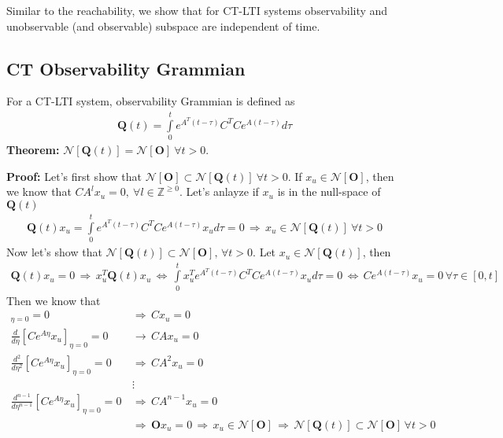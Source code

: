 \documentclass[twoside]{article}
\begin{document}
%
Similar to the reachability, we show that for CT-LTI systems
observability and unobservable (and observable) subspace
are independent of time. 

\subsection{CT Observability Grammian}

For a CT-LTI system, observability Grammian is defined as
%
\begin{align*}
    \textbf{Q}(t) = \int\limits_{0}^{t} e^{A^T (t - \tau)} C^T C e^{A (t - \tau)}  d \tau 
\end{align*}
%
\textbf{Theorem:} $\mathcal{N}[ \textbf{Q}(t) ] = \mathcal{N}[ \mathbf{O} ] \ \forall t > 0$. 

\textbf{Proof:} Let's first show that $\mathcal{N}[ \mathbf{O} ] \subset \mathcal{N}[ \textbf{Q}(t) ] \ \forall t > 0$. 
If $x_u \in \mathcal{N}[ \mathbf{O} ]$, then we know that $C A^{l} x_u = 0, \ \forall l \in \mathbb{Z}^{\geq 0}$. Let's anlayze 
if $x_u$ is in the null-space of $\textbf{Q}(t)$
%
\begin{align*}
    \textbf{Q}(t) x_u = \int\limits_{0}^{t} e^{A^T (t - \tau)} C^T C e^{A (t - \tau)} x_u d \tau
    = 0 \, \Rightarrow \, x_u \in \mathcal{N}[ \textbf{Q}(t) ] \ \forall t > 0
\end{align*}
%
Now let's show that $\mathcal{N}[ \textbf{Q}(t) ] \subset \mathcal{N}[ \mathbf{O} ], \, \forall t > 0$.
Let $x_u \in \mathcal{N}[ \textbf{Q}(t) ]$, then
\begin{align*}
    \textbf{Q}(t) x_u = 0 \, \Rightarrow \, x_u^T \textbf{Q}(t) x_u \, \iff \, \int\limits_{0}^{t} x_u^T e^{A^T (t - \tau)} C^T C e^{A (t - \tau)} x_u d \tau
    = 0 \, \iff \, C e^{A (t - \tau)} x_u = 0 \, \forall \tau \in [0 , t]
\end{align*}
%
Then we know that 
%
\begin{align*}
  [ C e^{A \eta} x_u]_{\eta = 0} = 0 \, &\Rightarrow \, C x_u = 0
  \\
  \frac{d}{d\eta}[ C e^{A \eta} x_u ]_{\eta = 0} = 0 \, &\rightarrow \, C A x_u = 0
  \\
  \frac{d^2}{d\eta^2}[ C e^{A \eta} x_u ]_{\eta = 0} = 0 \, &\Rightarrow \, C A^2 x_u = 0
  \\
  &\vdots
    \\
    \frac{d^{n-1}}{d\eta^{n-1}}[ C e^{A \eta} x_u ]_{\eta = 0} = 0 \, &\Rightarrow \, C A^{n-1} x_u = 0
    \\
    &\Rightarrow \, \mathbf{O} x_u = 0 \, \Rightarrow \, x_u \in \mathcal{N}[ \mathbf{O} ]
    \, \Rightarrow \, \mathcal{N}[ \textbf{Q}(t) ] \subset \mathcal{N}[ \mathbf{O} ] \, \forall t > 0
\end{align*}
\end{document}
